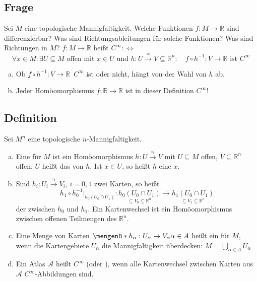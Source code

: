 \subsection[Frage zur Differenzierbarkeit von Funktionen auf Mannigfaltigkeiten]{Frage} %
\label{sub:151}
Sei $M$ eine topologische Mannigfaltigkeit. Welche Funktionen $f : M \to \mathds{R}$ sind differenzierbar? Was sind Richtungsableitungen für solche Funktionen? Was sind 
Richtungen in $M$?
$f : M \to \mathds{R}$ heißt $C^\infty :\Leftrightarrow$
\[
	\forall x \in M : \exists  U \subseteq M \text{ offen mit } x \in U \text { und } h : U \xrightarrow{\approx}  V \subseteq \mathds{R}^n : \quad 
	f \circ h ^{-1} : V \to \mathds{R} \text{ ist } C^\infty
\]
\begin{enumerate}[a)]
	\item Ob $f \circ h ^{-1} : V \to \mathds{R}$ $\, C^\infty$ ist oder nicht, hängt von der Wahl von $h$ ab.
	\item Jeder Homöomorphismus $f : \mathds{R} \to \mathds{R}$ ist in dieser Definition $C^\infty$!
\end{enumerate}

\subsection[Definition: Karten, Kartenwechsel, Atlanten]{Definition} %
\label{sub:152}
Sei $M^n$ eine topologische $n$-Mannigfaltigkeit. 
\begin{enumerate}[a)]
	\item Eine  für $M$ ist ein Homöomorphismus $h : U \xrightarrow{\approx}V$ mit $U \subseteq M$ offen, $V\subseteq\mathds{R}^n$ offen. $U$ heißt das 
	 von $h$. Ist $x \in U$, so heißt $h$ eine  $x$.
	\item Sind $h_i : U_i \xrightarrow{\approx} V_i$, $i=0,1$ zwei Karten, so heißt 
	\[
		h_1 \circ h_0 ^{-1}\big|_{h_0(U_0 \cap U_1)} : \underset{\subseteq V_0 \subseteq \mathds{R}^n}{h_0(U_0 \cap U_1)} \to \underset{\subseteq V_1 \subseteq 
		\mathds{R}^n}{h_1 (U_0 \cap U_1)}
	\]
	der  zwischen $h_0$ und $h_1$. Ein Kartenwechsel ist ein Homöomorphismus zwischen offenen Teilmengen des $\mathds{R}^n$. 
	\item Eine Menge von Karten $\set[h_\alpha : U_\alpha \to V_\alpha]{\alpha \in A}$ heißt ein  für $M$, wenn die Kartengebiete $U_\alpha$ die 
	Mannigfaltigkeit überdecken:
	\(
		M = \bigcup_{\alpha \in A} U_\alpha
	\)
	\item Ein Atlas $\mathcal{A}$ heißt $C^\infty$ (oder ), wenn alle Kartenwechsel zwischen Karten aus $\mathcal{A}$ 
	$C^\infty$-Abbildun\-gen sind.
\end{enumerate}

